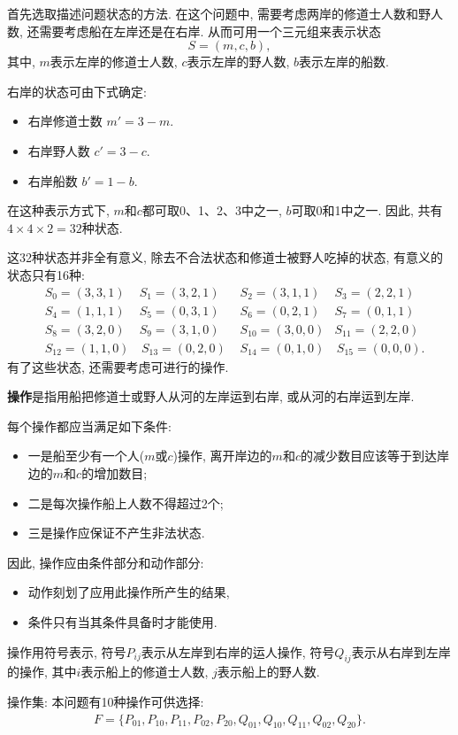 \begin{result}
首先选取描述问题状态的方法. 在这个问题中, 需要考虑两岸的修道士人数和野人数, 还需要考虑船在左岸还是在右岸. 从而可用一个三元组来表示状态
         $$S=(m, c, b),$$
其中, $m$表示左岸的修道士人数, $c$表示左岸的野人数, $b$表示左岸的船数.

右岸的状态可由下式确定:
\begin{itemize}
\item 右岸修道士数  $m'=3-m$.
\item 右岸野人数   $ c'=3-c$.
\item 右岸船数      $b'=1-b$.
\end{itemize}
在这种表示方式下, $m$和$c$都可取0、1、2、3中之一, $b$可取0和1中之一. 因此, 共有$4\times 4\times 2=32$种状态.

这32种状态并非全有意义, 除去不合法状态和修道士被野人吃掉的状态, 有意义的状态只有16种:
\begin{align*}
        &S_0=(3, 3, 1)  &S_1=(3, 2, 1)     &\,\,S_2=(3, 1, 1)&S_3=(2, 2, 1)\\
        &S_4=(1, 1, 1)  &S_5=(0, 3, 1)     &\,\,S_6=(0, 2, 1)&S_7=(0, 1, 1)\\
        &S_8=(3, 2, 0)  &S_9=(3, 1, 0)     &\,\,S_{10}=(3, 0, 0)&S_{11}=(2, 2, 0)\\
        &S_{12}=(1, 1,0)&\,S_{13}=(0, 2, 0)  &\,\,S_{14}=(0, 1, 0)&\,S_{15}=(0, 0, 0).
\end{align*}
有了这些状态, 还需要考虑可进行的操作.

\textbf{操作}是指用船把修道士或野人从河的左岸运到右岸, 或从河的右岸运到左岸.

每个操作都应当满足如下条件:
\begin{itemize}
\item 一是船至少有一个人($m$或$c$)操作, 离开岸边的$m$和$c$的减少数目应该等于到达岸边的$m$和$c$的增加数目;
\item 二是每次操作船上人数不得超过2个;
\item 三是操作应保证不产生非法状态.
\end{itemize}
因此, 操作应由条件部分和动作部分:
\begin{itemize}
\item 动作刻划了应用此操作所产生的结果,
\item 条件只有当其条件具备时才能使用.
\end{itemize}
操作用符号表示, 符号$P_{ij}$表示从左岸到右岸的运人操作, 符号$Q_{ij}$表示从右岸到左岸的操作, 其中$i$表示船上的修道士人数, $j$表示船上的野人数.

操作集: 本问题有10种操作可供选择:
\begin{align}
  F=\{P_{01}, P_{10}, P_{11}, P_{02}, P_{20},Q_{01}, Q_{10}, Q_{11}, Q_{02}, Q_{20}\}.
\end{align}


\end{result}
